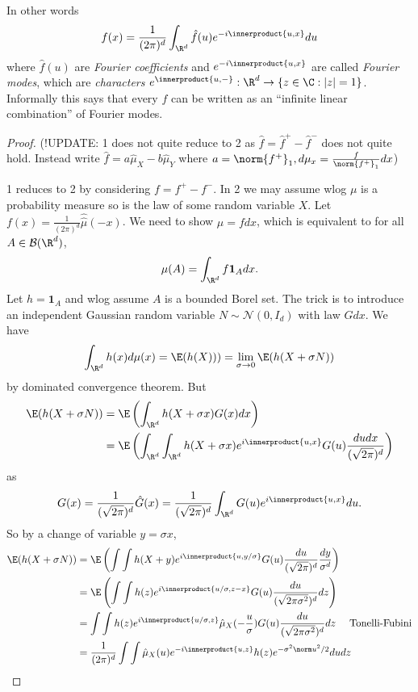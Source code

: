 \documentclass[a4paper]{article}
\newcommand*{\ip}{\innerproduct} %
\begin{document}
\begin{remark}
  In other words
  \[
    f(x) = \frac{1}{(2\pi)^d} \int_{\R^d} \hat f(u) e^{-i \ip{u, x}} du
  \]
  where \(\hat f(u)\) are \emph{Fourier coefficients} and \(e^{-i\ip{u, x}}\) are called \emph{Fourier modes}, which are \emph{characters} \(e^{\ip{u, -}}: \R^d \to \{z \in \C: |z| = 1\}\). Informally this says that every \(f\) can be written as an ``infinite linear combination'' of Fourier modes.
\end{remark}

\begin{proof}
  (!UPDATE: 1 does not quite reduce to 2 as \(\hat f = \hat f^+ - \hat f^-\) does not quite hold. Instead write \(\hat f = a \hat \mu_X - b \hat \mu_Y\) where \(a = \norm{f^+}_1, d\mu_x = \frac{f}{\norm{f^+}_1}dx\))
  
  1 reduces to 2 by considering \(f = f^+ - f^-\). In 2 we may assume wlog \(\mu\) is a probability measure so is the law of some random variable \(X\). Let \(f(x) = \frac{1}{(2\pi)^d} \hat{\hat \mu}(-x)\). We need to show \(\mu = fdx\), which is equivalent to for all \(A \in \mathcal B(\R^d)\),
  \[
    \mu(A) = \int_{\R^d} f \mathbf 1_A dx.
  \]
  Let \(h = \mathbf 1_A\) and wlog assume \(A\) is a bounded Borel set. The trick is to introduce an independent Gaussian random variable \(N \sim \mathcal N(0, I_d)\) with law \(G dx\). We have
  \[
    \int_{\R^d} h(x) d\mu(x) = \E(h(X))) = \lim_{\sigma \to 0} \E(h(X + \sigma N))
  \]
  by dominated convergence theorem. But
  \begin{align*}
    \E(h(X + \sigma N))
    &= \E \left(\int_{\R^d} h(X + \sigma x) G(x) dx \right) \\
    &= \E \left(\int_{\R^d} \int_{\R^d} h(X + \sigma x) e^{i \ip{u, x}} G(u) \frac{du dx}{(\sqrt{2\pi})^d} \right) \\
  \end{align*}
  as
  \[
    G(x) = \frac{1}{(\sqrt{2\pi})^d} \hat G(x) = \frac{1}{(\sqrt{2\pi})^d} \int_{\R^d} G(u) e^{i \ip{u, x}} du.
  \]
  So by a change of variable \(y = \sigma x\),
  \begin{align*}
    \E(h(X + \sigma N))
    &= \E \left(\int \int h(X + y) e^{i \ip{u, y/\sigma}} G(u) \frac{du}{(\sqrt{2\pi})^d} \frac{dy}{\sigma^d} \right) \\
    &= \E \left(\int \int h(z) e^{i \ip{u/\sigma, z - x}} G(u) \frac{du}{(\sqrt{2\pi \sigma^2})^d} dz \right) \\
    &= \int \int h(z) e^{i \ip{u/\sigma, z}} \hat \mu_X(- \frac{u}{\sigma}) G(u) \frac{du}{(\sqrt{2\pi \sigma^2})^d} dz \quad \text{ Tonelli-Fubini} \\
    &= \frac{1}{(2\pi)^d} \int \int \hat \mu_X(u) e^{-i \ip{u, z}} h(z) e^{-\sigma^2 \norm u^2/2} dudz
  \end{align*}
\end{proof}
\end{document}
